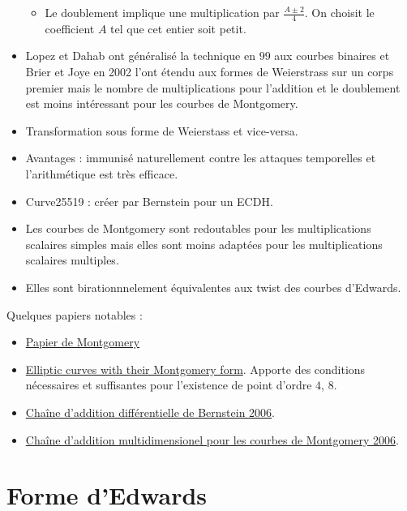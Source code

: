 \documentclass[a4paper]{report}
\begin{document}
\begin{itemize}[label=$\bullet$]
\begin{itemize}[label=--]
        \item Le doublement implique une multiplication par $\frac{A \pm 2}{4}$. On choisit le coefficient $A$ tel que cet entier soit petit.
    \end{itemize}
    \item Lopez et Dahab ont généralisé la technique en $99$ aux courbes binaires et Brier et Joye en 2002 l'ont étendu aux formes de Weierstrass sur un corps premier mais le nombre de multiplications pour l'addition et le doublement est moins intéressant pour les courbes de Montgomery. 
    \item Transformation sous forme de Weierstass et vice-versa. 
    \item Avantages : immunisé naturellement contre les attaques temporelles et l'arithmétique est très efficace.
    \item Curve25519 : créer par Bernstein pour un ECDH.
    \item Les courbes de Montgomery sont redoutables pour les multiplications scalaires simples mais elles sont moins adaptées pour les multiplications scalaires multiples.
    \item Elles sont birationnnelement équivalentes aux twist des courbes d'Edwards.
\end{itemize}

Quelques papiers notables :
\begin{itemize}[label=--]
    \item \href{http://sage.math.washington.edu/edu/124/misc/montgomery.pdf}{Papier de Montgomery}
    \item \href{http://saluc.engr.uconn.edu/refs/sidechannel/okeya00elliptic.pdf}{Elliptic curves with their Montgomery form}. Apporte des conditions nécessaires et suffisantes pour l'existence de point d'ordre $4$, $8$.
    \item \href{http://cr.yp.to/ecdh/diffchain-20060219.pdf}{Chaîne d'addition différentielle de Bernstein 2006}.
    \item \href{https://eprint.iacr.org/2006/220.pdf}{Chaîne d'addition multidimensionel pour les courbes de Montgomery 2006}.
\end{itemize}

\section{Forme d'Edwards}
\end{document}

